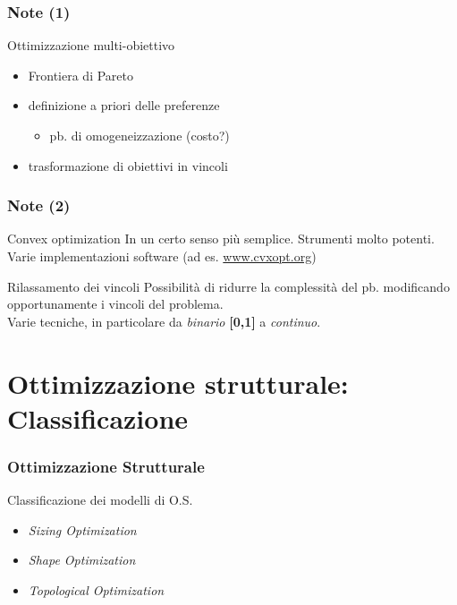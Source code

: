 \documentclass{beamer}
\begin{document}

\begin{frame}
	\frametitle{Note (1)}
	\begin{block}{Ottimizzazione multi-obiettivo}
		\begin{itemize}
			\item Frontiera di Pareto
			\item definizione a priori delle preferenze
			\begin{itemize}
				\item pb. di omogeneizzazione (costo?)
			\end{itemize}
			\item trasformazione di obiettivi in vincoli
		\end{itemize}
	\end{block}
\end{frame}

\begin{frame}
	\frametitle{Note (2)}
	
	\begin{block}{Convex optimization}
		In un certo senso pi\`{u} semplice. Strumenti molto potenti. Varie implementazioni software (ad es. \url{www.cvxopt.org})
	\end{block}

	\begin{block}{Rilassamento dei vincoli}
		Possibilit\`{a} di ridurre la complessit\`{a} del pb. modificando opportunamente i vincoli del problema.\\
		Varie tecniche, in particolare da \textit{binario} \textbf{[0,1]} a \textit{continuo}.
	\end{block}
\end{frame}


\section{Ottimizzazione strutturale: Classificazione}


\begin{frame}
	\frametitle{Ottimizzazione Strutturale}
	Classificazione dei modelli di O.S.\cite{christensen2008introduction}
	\begin{itemize}
		\item \textit{Sizing Optimization}
		\item \textit{Shape Optimization}
		\item \textit{Topological Optimization}
	\end{itemize}
\end{frame}
\end{document}
